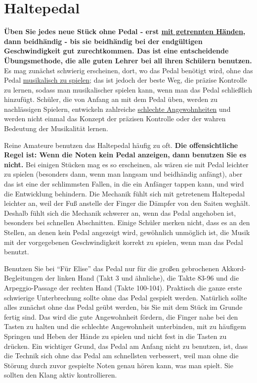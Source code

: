 
\section{Haltepedal}\hypertarget{c1ii23}{}

\textbf{Üben Sie jedes neue Stück ohne Pedal - erst \hyperlink{c1ii7}{mit getrennten Händen}, dann beidhändig - bis sie beidhändig bei der endgültigen Geschwindigkeit gut zurechtkommen.
Das ist eine entscheidende Übungsmethode, die alle guten Lehrer bei all ihren Schülern benutzen.}
Es mag zunächst schwierig erscheinen, dort, wo das Pedal benötigt wird, ohne das Pedal \hyperlink{c1iii14d}{musikalisch zu spielen};
das ist jedoch der beste Weg, die präzise Kontrolle zu lernen, sodass man musikalischer spielen kann, wenn man das Pedal schließlich hinzufügt.
Schüler, die von Anfang an mit dem Pedal üben, werden zu nachlässigen Spielern, entwickeln zahlreiche \hyperlink{c1ii22}{schlechte Angewohnheiten} und werden nicht einmal das Konzept der präzisen Kontrolle oder der wahren Bedeutung der Musikalität lernen.

Reine Amateure benutzen das Haltepedal häufig zu oft.
\textbf{Die offensichtliche Regel ist: Wenn die Noten kein Pedal anzeigen, dann benutzen Sie es nicht.}
Bei einigen Stücken mag es so erscheinen, als wären sie mit Pedal leichter zu spielen (besonders dann, wenn man langsam und beidhändig anfängt), aber das ist eine der schlimmsten Fallen, in die ein Anfänger tappen kann, und wird die Entwicklung behindern.
Die Mechanik fühlt sich mit getretenem Haltepedal leichter an, weil der Fuß anstelle der Finger die Dämpfer von den Saiten weghält.
Deshalb fühlt sich die Mechanik schwerer an, wenn das Pedal angehoben ist, besonders bei schnellen Abschnitten.
Einige Schüler merken nicht, dass es an den Stellen, an denen kein Pedal angezeigt wird, gewöhnlich unmöglich ist, die Musik mit der vorgegebenen Geschwindigkeit korrekt zu spielen, wenn man das Pedal benutzt.

Benutzen Sie bei \enquote{Für Elise} das Pedal nur für die großen gebrochenen Akkord-Begleitungen der linken Hand (Takt 3 und ähnliche), die Takte 83-96 und die Arpeggio-Passage der rechten Hand (Takte 100-104).
Praktisch die ganze erste schwierige Unterbrechung sollte ohne das Pedal gespielt werden.
Natürlich sollte alles zunächst ohne das Pedal geübt werden, bis Sie mit dem Stück im Grunde fertig sind.
Das wird die gute Angewohnheit fördern, die Finger nahe bei den Tasten zu halten und die schlechte Angewohnheit unterbinden, mit zu häufigem Springen und Heben der Hände zu spielen und nicht fest in die Tasten zu drücken.
Ein wichtiger Grund, das Pedal am Anfang nicht zu benutzen, ist, dass die Technik sich ohne das Pedal am schnellsten verbessert, weil man ohne die Störung durch zuvor gespielte Noten genau hören kann, was man spielt.
Sie sollten den Klang aktiv kontrollieren.

